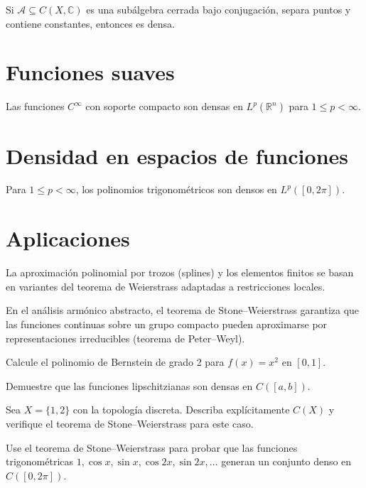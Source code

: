 \begin{corollary}
\label{cor:stone-complejo}
Si $\mathcal{A}\subseteq C(X,\mathbb{C})$ es una subálgebra cerrada bajo conjugación, separa puntos y contiene constantes, entonces es densa.
\end{corollary}

\section{Funciones suaves}

\begin{theorem}
\label{teo:aprox-cinfinito}
Las funciones $C^{\infty}$ con soporte compacto son densas en $L^p(\mathbb{R}^n)$ para $1\leq p<\infty$.
\end{theorem}

\section{Densidad en espacios de funciones}

\begin{theorem}
\label{teo:densidad-lp}
Para $1\leq p<\infty$, los polinomios trigonométricos son densos en $L^p([0,2\pi])$.
\end{theorem}

\section{Aplicaciones}

\begin{example}
\label{ej:numericos}
La aproximación polinomial por trozos (splines) y los elementos finitos se basan en variantes del teorema de Weierstrass adaptadas a restricciones locales.
\end{example}

\begin{example}
\label{ej:representacion}
En el análisis armónico abstracto, el teorema de Stone--Weierstrass garantiza que las funciones continuas sobre un grupo compacto pueden aproximarse por representaciones irreducibles (teorema de Peter--Weyl).
\end{example}

\begin{exercise}
Calcule el polinomio de Bernstein de grado 2 para $f(x)=x^2$ en $[0,1]$.
\end{exercise}

\begin{exercise}
Demuestre que las funciones lipschitzianas son densas en $C([a,b])$.
\end{exercise}

\begin{exercise}
Sea $X=\{1,2\}$ con la topología discreta. Describa explícitamente $C(X)$ y verifique el teorema de Stone--Weierstrass para este caso.
\end{exercise}

\begin{problem}
Use el teorema de Stone--Weierstrass para probar que las funciones trigonométricas $1,\cos x,\sin x,\cos 2x,\sin 2x,\dots$ generan un conjunto denso en $C([0,2\pi])$.
\end{problem}

